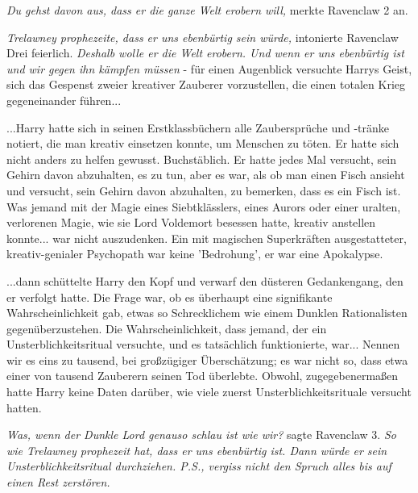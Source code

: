 \emph{Du gehst davon aus, dass er die ganze Welt erobern will,} merkte Ravenclaw
2 an.

\emph{Trelawney prophezeite, dass er uns ebenbürtig sein würde,} intonierte
Ravenclaw Drei feierlich. \emph{Deshalb wolle er die Welt erobern. Und wenn er
uns ebenbürtig ist und wir gegen ihn kämpfen müssen} - für einen Augenblick
versuchte Harrys Geist, sich das Gespenst zweier kreativer Zauberer
vorzustellen, die einen totalen Krieg gegeneinander führen...

...Harry hatte sich in seinen Erstklassbüchern alle Zaubersprüche und -tränke
notiert, die man kreativ einsetzen konnte, um Menschen zu töten. Er hatte sich
nicht anders zu helfen gewusst. Buchstäblich. Er hatte jedes Mal versucht, sein
Gehirn davon abzuhalten, es zu tun, aber es war, als ob man einen Fisch ansieht
und versucht, sein Gehirn davon abzuhalten, zu bemerken, dass es ein Fisch ist.
Was jemand mit der Magie eines Siebtklässlers, eines Aurors oder einer uralten,
verlorenen Magie, wie sie Lord Voldemort besessen hatte, kreativ anstellen
konnte... war nicht auszudenken. Ein mit magischen Superkräften ausgestatteter,
kreativ-genialer Psychopath war keine 'Bedrohung', er war eine Apokalypse.

...dann schüttelte Harry den Kopf und verwarf den düsteren Gedankengang, den er
verfolgt hatte. Die Frage war, ob es überhaupt eine signifikante
Wahrscheinlichkeit gab, etwas so Schrecklichem wie einem Dunklen Rationalisten
gegenüberzustehen. Die Wahrscheinlichkeit, dass jemand, der ein
Unsterblichkeitsritual versuchte, und es tatsächlich funktionierte, war...
Nennen wir es eins zu tausend, bei großzügiger Überschätzung; es war nicht so,
dass etwa einer von tausend Zauberern seinen Tod überlebte. Obwohl,
zugegebenermaßen hatte Harry keine Daten darüber, wie viele zuerst
Unsterblichkeitsrituale versucht hatten.

\emph{Was, wenn der Dunkle Lord genauso schlau ist wie wir?} sagte Ravenclaw 3.
\emph{So wie Trelawney prophezeit hat, dass er uns ebenbürtig ist. Dann würde er
sein Unsterblichkeitsritual durchziehen. P.S., vergiss nicht den Spruch \glqq{}
alles bis auf einen Rest zerstören\grqq{}.}

